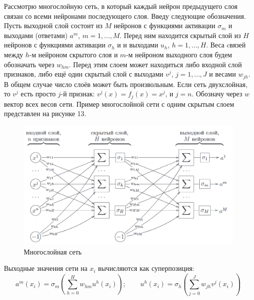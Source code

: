 Рассмотрю многослойную сеть, в который каждый нейрон предыдущего слоя
связан со всеми нейронами последующего слоя. Введу следующие обозначения. Пусть выходной слой состоит из \(M\) нейронов с функциями активации \(\sigma_m\) и выходами (ответами) \(a^m\), \(m=1,...,M\). Перед ним находится скрытый слой из \(H\) нейронов с функциями активации \(\sigma_h\) и и выходами \(u_h\), \(h=1,...,H\). Веса cвязей между \(h\)-м нейроном скрытого слоя и \(m\)-м нейроном выходного слоя будем обозначать через \(w_{hm}\). Перед этим слоем может находиться либо входной слой признаков, либо ещё один скрытый слой с выходами \(v^j\), \(j=1,...,J\) и весами \(w_{jh}\). В общем случае число слоёв может быть произвольным. Если сеть двухслойная, то \(v^j\) есть просто \(j\)-й признак: \(v^j(x)=f_j(x)=x^j\), и \(j=n\). Обозначу через \(w\) вектор всех весов сети. Пример многослойной сети с одним скрытым слоем представлен на рисунке 13. 
\begin{figure}[ht]
    \centering
    \includegraphics[width=1\textwidth]{images/nn.png}
    \caption{Многослойная сеть}
    \label{fig:nn}
\end{figure}

Выходные значения сети на \(x_i\) вычисляются как суперпозиция:
\begin{equation}
a^m(x_i) = \sigma_m \left(\sum_{h=0}^H w_{hm} u^h(x_i) \right); \qquad
u^h(x_i) = \sigma_h \left(\sum_{j=0}^J w_{jh} v^j(x_i) \right)
\end{equation}

